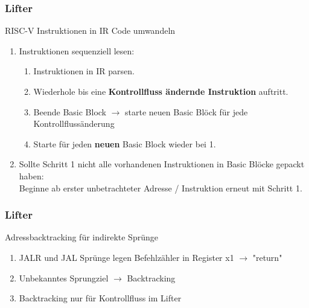 
\begin{frame}
    \frametitle{Lifter}{RISC-V Instruktionen in IR Code umwandeln}

    \begin{enumerate}
        \setlength\itemsep{0.6em}
        \item Instruktionen sequenziell lesen:
            \vspace{0.5em}
            \begin{enumerate}
                \setlength\itemsep{0.6em}
                \item Instruktionen in IR parsen.
                \item Wiederhole bis eine \textbf{Kontrollfluss ändernde Instruktion} auftritt.
                \item Beende Basic Block $\rightarrow$ starte neuen Basic Blöck für jede Kontrollflussänderung 
                \item Starte für jeden \textbf{neuen} Basic Block wieder bei 1.
            \end{enumerate}
        \item Sollte Schritt 1 nicht alle vorhandenen Instruktionen in Basic Blöcke gepackt haben:\\ Beginne ab erster unbetrachteter Adresse / Instruktion erneut mit Schritt 1.
    \end{enumerate}
\end{frame}
\clearpage



\begin{frame}
    \frametitle{Lifter}{Adressbacktracking für indirekte Sprünge}

    \begin{enumerate}
        \setlength\itemsep{0.5em}
        \item JALR und JAL Sprünge legen Befehlzähler in Register x1 $\rightarrow$ "return"
        \item Unbekanntes Sprungziel $\rightarrow$ Backtracking
        \item Backtracking nur für Kontrollfluss im Lifter
    \end{enumerate}
\end{frame}
\clearpage

